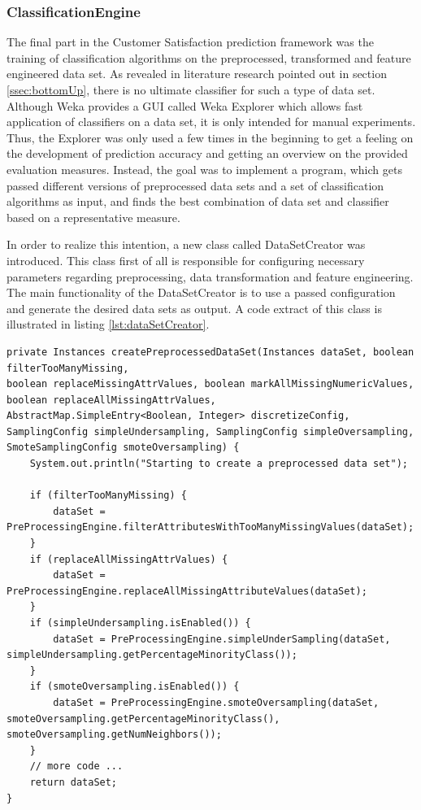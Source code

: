 \subsubsection{ClassificationEngine}
The final part in the Customer Satisfaction prediction framework was the training of classification algorithms on the preprocessed, transformed and feature engineered data set. As revealed in literature research pointed out in section \ref{ssec:bottomUp}, there is no ultimate classifier for such a type of data set. Although Weka provides a GUI called Weka Explorer which allows fast application of classifiers on a data set, it is only intended for manual experiments. Thus, the Explorer was only used a few times in the beginning to get a feeling on the development of prediction accuracy and getting an overview on the provided evaluation measures. Instead, the goal was to implement a program, which gets passed different versions of preprocessed data sets and a set of classification algorithms as input, and finds the best combination of data set and classifier based on a representative measure. 

In order to realize this intention, a new class called DataSetCreator was introduced. This class first of all is responsible for configuring necessary parameters regarding preprocessing, data transformation and feature engineering. The main functionality of the DataSetCreator is to use a passed configuration and generate the desired data sets as output. A code extract of this class is illustrated in listing \ref{lst:dataSetCreator}. 

\begin{lstlisting}[caption={DataSetCreator}, label={lst:dataSetCreator}]
private Instances createPreprocessedDataSet(Instances dataSet, boolean filterTooManyMissing,
boolean replaceMissingAttrValues, boolean markAllMissingNumericValues,
boolean replaceAllMissingAttrValues,
AbstractMap.SimpleEntry<Boolean, Integer> discretizeConfig,
SamplingConfig simpleUndersampling, SamplingConfig simpleOversampling,
SmoteSamplingConfig smoteOversampling) {
	System.out.println("Starting to create a preprocessed data set");
	
	if (filterTooManyMissing) {
		dataSet = PreProcessingEngine.filterAttributesWithTooManyMissingValues(dataSet);
	}
	if (replaceAllMissingAttrValues) {
		dataSet = PreProcessingEngine.replaceAllMissingAttributeValues(dataSet);
	}
	if (simpleUndersampling.isEnabled()) {
		dataSet = PreProcessingEngine.simpleUnderSampling(dataSet, simpleUndersampling.getPercentageMinorityClass());
	}
	if (smoteOversampling.isEnabled()) {
		dataSet = PreProcessingEngine.smoteOversampling(dataSet, smoteOversampling.getPercentageMinorityClass(), smoteOversampling.getNumNeighbors());
	}
	// more code ...
	return dataSet;
}
\end{lstlisting}

